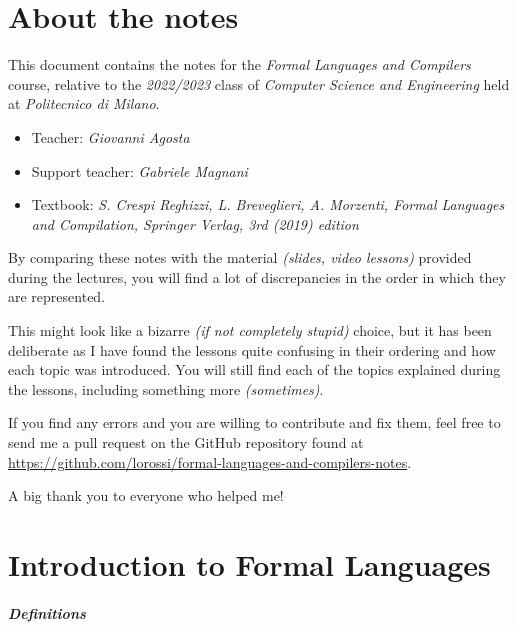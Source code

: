 \documentclass[english]{article}
\begin{document}

\section*{About the notes}

This document contains the notes for the \textit{Formal Languages and Compilers} course, relative to the \textit{2022/2023} class of \textit{Computer Science and Engineering} held at \textit{Politecnico di Milano}.

\bigskip
\begin{itemize}
  \item Teacher: \textit{Giovanni Agosta}
  \item Support teacher: \textit{Gabriele Magnani}
  \item Textbook: \textit{S. Crespi Reghizzi, L. Breveglieri, A. Morzenti, Formal Languages and Compilation, Springer Verlag, 3rd (2019) edition}
\end{itemize}

\bigskip
By comparing these notes with the material \textit{(slides, video lessons)} provided during the lectures, you will find a lot of discrepancies in the order in which they are represented.

This might look like a bizarre \textit{(if not completely stupid)} choice, but it has been deliberate as I have found the lessons quite confusing in their ordering and how each topic was introduced.
You will still find each of the topics explained during the lessons, including something more \textit{(sometimes)}.

\bigskip
If you find any errors and you are willing to contribute and fix them, feel free to send me a pull request on the GitHub repository found at \href{github.com/lorossi/formal-languages-and-compilers-notes}{https://github.com/lorossi/formal-languages-and-compilers-notes}.

\bigskip
A big thank you to everyone who helped me!

\clearpage

\section{Introduction to Formal Languages}

\subparagraph*{Definitions}
\end{document}

